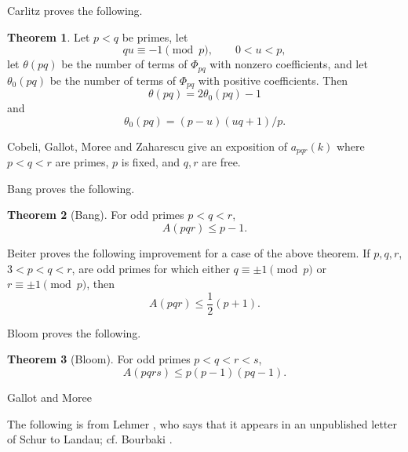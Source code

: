 \documentclass{article}
\theoremstyle{definition}
\newtheorem{theorem}{Theorem}
\theoremstyle{definition}
\begin{document}
Carlitz \cite{carlitz1966} proves the following.

\begin{theorem}
Let $p<q$ be primes,
let
\[
qu \equiv -1 \pmod{p},\qquad 0<u<p,
\]
let 
$\theta(pq)$ be the number of terms of $\Phi_{pq}$ with nonzero coefficients,
and
let $\theta_0(pq)$ be the number of terms of $\Phi_{pq}$ with positive coefficients.
Then
\[
\theta(pq) = 2\theta_0(pq)-1
\]
and
\[
\theta_0(pq) = (p-u)(uq+1)/p.
\]
\end{theorem}

Cobeli, Gallot, Moree and Zaharescu \cite{cobeli} give an exposition of $a_{pqr}(k)$ where $p<q<r$ are primes,
$p$ is fixed, and $q,r$ are free.






Bang \cite{bang} proves the following.

\begin{theorem}[Bang]
For odd primes $p<q<r$,
\[
A(pqr) \leq p-1.
\] 
\end{theorem}

Beiter \cite{beiter1968} proves the following improvement for a case of the above theorem.
If $p,q,r$, $3<p<q<r$, are odd primes for which
either $q \equiv \pm 1 \pmod{p}$ or $r \equiv \pm 1 \pmod{p}$, then
\[
A(pqr) \leq \frac{1}{2}(p+1).
\]



Bloom \cite{bloom} proves the following.

\begin{theorem}[Bloom]
For odd primes $p<q<r<s$,
\[
A(pqrs) \leq p(p-1)(pq-1).
\]
\end{theorem}

Gallot and Moree \cite{ternary}



The following is from Lehmer \cite{lehmer}, who says that it appears in an unpublished letter of Schur to Landau;
cf. Bourbaki \cite[V.~165, \S 11, Exercise 19]{bourbaki}.
\end{document}
